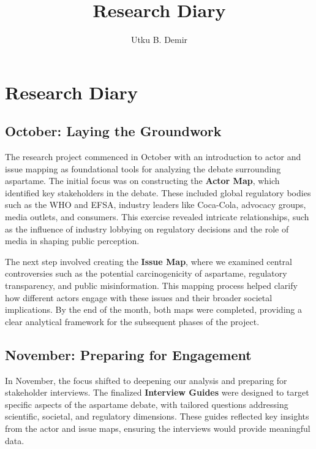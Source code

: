 
\title{Research Diary}
\author{Utku B. Demir}


\maketitle
\section*{Research Diary}

\subsection*{October: Laying the Groundwork}
The research project commenced in October with an introduction to actor and issue mapping as foundational tools for analyzing the debate surrounding aspartame. The initial focus was on constructing the \textbf{Actor Map}, which identified key stakeholders in the debate. These included global regulatory bodies such as the WHO and EFSA, industry leaders like Coca-Cola, advocacy groups, media outlets, and consumers. This exercise revealed intricate relationships, such as the influence of industry lobbying on regulatory decisions and the role of media in shaping public perception.

The next step involved creating the \textbf{Issue Map}, where we examined central controversies such as the potential carcinogenicity of aspartame, regulatory transparency, and public misinformation. This mapping process helped clarify how different actors engage with these issues and their broader societal implications. By the end of the month, both maps were completed, providing a clear analytical framework for the subsequent phases of the project.

\subsection*{November: Preparing for Engagement}
In November, the focus shifted to deepening our analysis and preparing for stakeholder interviews. The finalized \textbf{Interview Guides} were designed to target specific aspects of the aspartame debate, with tailored questions addressing scientific, societal, and regulatory dimensions. These guides reflected key insights from the actor and issue maps, ensuring the interviews would provide meaningful data.

